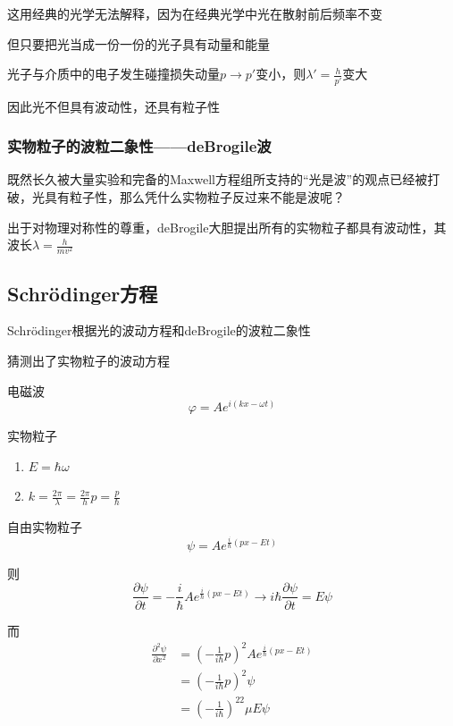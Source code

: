 \documentclass[lang=cn,15pt]{elegantbook}
\begin{document}
这用经典的光学无法解释，因为在经典光学中光在散射前后频率不变

但只要把光当成一份一份的光子具有动量和能量

光子与介质中的电子发生碰撞损失动量$p\rightarrow p'$变小，则$\lambda'=\frac{h}{p'}$变大

因此光不但具有波动性，还具有粒子性

\subsubsection{实物粒子的波粒二象性——deBrogile波}
既然长久被大量实验和完备的Maxwell方程组所支持的“光是波”的观点已经被打破，光具有粒子性，那么凭什么实物粒子反过来不能是波呢？

出于对物理对称性的尊重，deBrogile大胆提出所有的实物粒子都具有波动性，其波长$
\lambda=\frac{h}{mv^2}$
\subsection{Schrödinger方程}
Schrödinger根据光的波动方程和deBrogile的波粒二象性

猜测出了实物粒子的波动方程

电磁波
\begin{equation}
	\varphi =Ae^{i\left( kx-\omega t \right)}
\end{equation}

实物粒子
\begin{enumerate}
	\item $E=\hbar\omega$
	\item $k=\frac{2\pi}{\lambda}=\frac{2\pi}{h}p=\frac{p}{\hbar}$
\end{enumerate}

自由实物粒子
\begin{equation}
	\psi =Ae^{\frac{i}{\hbar}\left( px-Et \right)}
\end{equation}

则
\begin{equation}
	\frac{\partial \psi}{\partial t}=-\frac{i}{\hbar}Ae^{\frac{i}{\hbar}\left( px-Et \right)}\rightarrow i\hbar \frac{\partial \psi}{\partial t}=E\psi 
\end{equation}

而
\begin{equation}
	\begin{split}
		\frac{\partial ^2\psi}{\partial x^2}&=\left( -\frac{1}{i\hbar}p \right) ^2Ae^{\frac{i}{\hbar}\left( px-Et \right)}
		\\
		&=\left( -\frac{1}{i\hbar}p \right) ^2\psi 
		\\
		&=\left( -\frac{1}{i\hbar} \right) ^22\mu E\psi 
	\end{split}
\end{equation}
\end{document}
